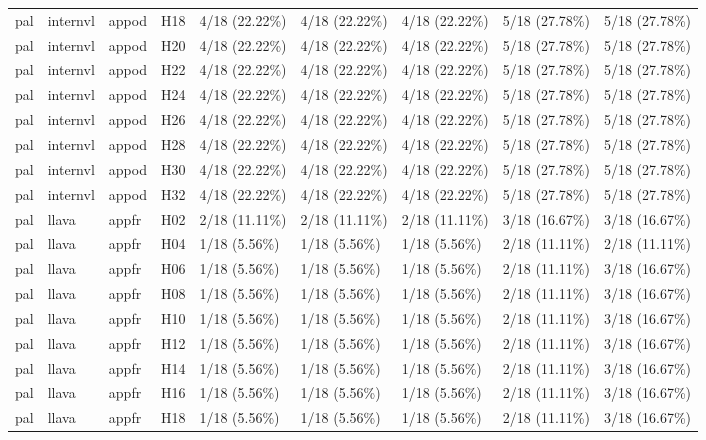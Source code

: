 \begin{longtable}{lllllllll}
pal & internvl & appod & H18 & 4/18 (22.22\%) & 4/18 (22.22\%) & 4/18 (22.22\%) & 5/18 (27.78\%) & 5/18 (27.78\%) \\
pal & internvl & appod & H20 & 4/18 (22.22\%) & 4/18 (22.22\%) & 4/18 (22.22\%) & 5/18 (27.78\%) & 5/18 (27.78\%) \\
pal & internvl & appod & H22 & 4/18 (22.22\%) & 4/18 (22.22\%) & 4/18 (22.22\%) & 5/18 (27.78\%) & 5/18 (27.78\%) \\
pal & internvl & appod & H24 & 4/18 (22.22\%) & 4/18 (22.22\%) & 4/18 (22.22\%) & 5/18 (27.78\%) & 5/18 (27.78\%) \\
pal & internvl & appod & H26 & 4/18 (22.22\%) & 4/18 (22.22\%) & 4/18 (22.22\%) & 5/18 (27.78\%) & 5/18 (27.78\%) \\
pal & internvl & appod & H28 & 4/18 (22.22\%) & 4/18 (22.22\%) & 4/18 (22.22\%) & 5/18 (27.78\%) & 5/18 (27.78\%) \\
pal & internvl & appod & H30 & 4/18 (22.22\%) & 4/18 (22.22\%) & 4/18 (22.22\%) & 5/18 (27.78\%) & 5/18 (27.78\%) \\
pal & internvl & appod & H32 & 4/18 (22.22\%) & 4/18 (22.22\%) & 4/18 (22.22\%) & 5/18 (27.78\%) & 5/18 (27.78\%) \\
pal & llava & appfr & H02 & 2/18 (11.11\%) & 2/18 (11.11\%) & 2/18 (11.11\%) & 3/18 (16.67\%) & 3/18 (16.67\%) \\
pal & llava & appfr & H04 & 1/18 (5.56\%) & 1/18 (5.56\%) & 1/18 (5.56\%) & 2/18 (11.11\%) & 2/18 (11.11\%) \\
pal & llava & appfr & H06 & 1/18 (5.56\%) & 1/18 (5.56\%) & 1/18 (5.56\%) & 2/18 (11.11\%) & 3/18 (16.67\%) \\
pal & llava & appfr & H08 & 1/18 (5.56\%) & 1/18 (5.56\%) & 1/18 (5.56\%) & 2/18 (11.11\%) & 3/18 (16.67\%) \\
pal & llava & appfr & H10 & 1/18 (5.56\%) & 1/18 (5.56\%) & 1/18 (5.56\%) & 2/18 (11.11\%) & 3/18 (16.67\%) \\
pal & llava & appfr & H12 & 1/18 (5.56\%) & 1/18 (5.56\%) & 1/18 (5.56\%) & 2/18 (11.11\%) & 3/18 (16.67\%) \\
pal & llava & appfr & H14 & 1/18 (5.56\%) & 1/18 (5.56\%) & 1/18 (5.56\%) & 2/18 (11.11\%) & 3/18 (16.67\%) \\
pal & llava & appfr & H16 & 1/18 (5.56\%) & 1/18 (5.56\%) & 1/18 (5.56\%) & 2/18 (11.11\%) & 3/18 (16.67\%) \\
pal & llava & appfr & H18 & 1/18 (5.56\%) & 1/18 (5.56\%) & 1/18 (5.56\%) & 2/18 (11.11\%) & 3/18 (16.67\%) \\

\end{longtable}
